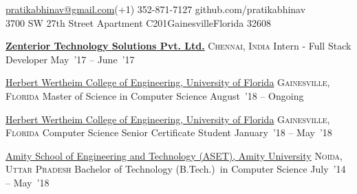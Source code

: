 \documentclass[10pt,a4paper]{article}
\begin{document}
\sloppy  %



\nobreakvspace{0.3em}  %

\noindent\href{mailto:pratikabhinav@gmail.com}{pratikabhinav\mbox{}@\mbox{}gmail.com}\sbull (+1) 352-871-7127 \sbull github.com/pratikabhinav\\
3700 SW 27th Street\sbull
Apartment C201\sbull Gainesville\sbull Florida 32608
\spacedhrule{0.5em}{-0.4em}


\headedsection  %
  {\href{}{\textbf{Zenterior Technology Solutions Pvt. Ltd.}}}
  {\textsc{Chennai, India}}
  {%
  \headedsubsection
    {Intern - Full Stack Developer}
    {May~'17 -- June~'17}
    {}
}


\headedsection
  {\href{}{Herbert Wertheim College of Engineering, University of Florida}}
  {\textsc{Gainesville, Florida}} {%
  \headedsubsection
    {Master of Science in Computer Science }
    {August~'18 -- Ongoing} {}
}

\headedsection
  {\href{}{Herbert Wertheim College of Engineering, University of Florida}}
  {\textsc{Gainesville, Florida}} {%
  \headedsubsection
    {Computer Science Senior Certificate Student}
    {January~'18 -- May~'18} {}
}

\headedsection
  {\href{}{Amity School of Engineering and Technology (ASET), Amity University}}
  {\textsc{Noida, Uttar Pradesh}} {%
  \headedsubsection
    {Bachelor of Technology (B.Tech.)~in Computer Science}
    {July~'14 -- May~'18} {}
}
\end{document}

